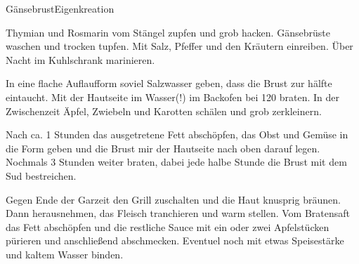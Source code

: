 \begin{recipe}{Gänsebrust}{Eigenkreation}
  \label{Gänsebrust}
  \inglist
  \steps

  Thymian und Rosmarin vom Stängel zupfen und grob hacken. Gänsebrüste waschen
  und trocken tupfen. Mit Salz, Pfeffer und den Kräutern einreiben. Über Nacht
  im Kuhlschrank marinieren.

  In eine flache Auflaufform soviel Salzwasser geben, dass die Brust zur hälfte
  eintaucht. Mit der Hautseite im Wasser(!) im Backofen bei 120 \celsius
  braten.  In der Zwischenzeit Äpfel, Zwiebeln und Karotten schälen und grob
  zerkleinern.

  Nach ca. 1 \halb Stunden das ausgetretene Fett abschöpfen, das Obst und
  Gemüse in die Form geben und die Brust mir der Hautseite nach oben darauf
  legen. Nochmals 3 Stunden weiter braten, dabei jede halbe Stunde die
  Brust mit dem Sud bestreichen.

  Gegen Ende der Garzeit den Grill zuschalten und die Haut knusprig bräunen.
  Dann herausnehmen, das Fleisch tranchieren und warm stellen. Vom
  Bratensaft das Fett abschöpfen und die restliche Sauce mit ein oder zwei
  Apfelstücken pürieren und anschließend abschmecken. Eventuel noch mit etwas
  Speisestärke und kaltem Wasser binden.

\end{recipe}
